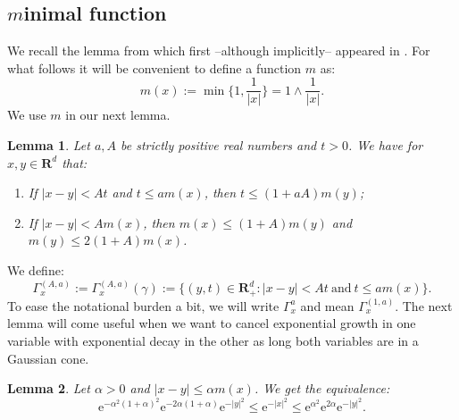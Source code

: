 \documentclass[a4paper,oneside,10pt]{amsproc}
\theoremstyle{plain}
\newtheorem{lemma}{Lemma}
\theoremstyle{remark}
\theoremstyle{definition}
\renewcommand{\leq}{\leqslant}
\renewcommand{\leq}{\leqslant}
\newcommand{\R}{\mathbf R}
\newcommand{\e}{\mathrm{e}} %
\renewcommand{\leq}{\leqslant}%
\begin{document}
\subsection{$m$inimal function}
We recall the lemma from \cite[lemma 2.3]{Maas2011b} which first
--although implicitly-- appeared in \cite{Mauceri2007}. For what
follows it will be convenient to define a function $m$ as:
\begin{equation*}
  m(x) := \min\biggl\{1, \frac1{|x|} \biggr\} = 1 \wedge \frac1{|x|}.
\end{equation*}
We use $m$ in our next lemma.
\begin{lemma}\label{lem:m-xy-equivalence}%
  Let $a, A$ be strictly positive real numbers and $t > 0$. We have
  for $x, y \in \R^d$ that:
  \begin{enumerate}
  \item If $|x - y| < A t$ and $t \leq a m(x)$, then $t
    \leq (1 + aA) m(y)$;
  \item If $|x - y| < A m(x)$, then $m(x) \leq (1 +
    A) m(y)$ and $m(y) \leq 2 (1 + A) m(x)$. 
  \end{enumerate}
\end{lemma}
We define:
\begin{equation}
  \label{eq:Gaussian-cone}
  \Gamma_x^{(A, a)} := \Gamma_x^{(A, a)}(\gamma) := \{(y, t) \in
  \R^d_+ : |x - y| < At \:\text{and}\: t \leq a m(x)\}.
\end{equation}
To ease the notational burden a bit, we will write $\Gamma_x^a$ and
mean $\Gamma_x^{(1, a)}$. 
The next lemma will come useful when we want to cancel exponential
growth in one variable with exponential decay in the other as long
both variables are in a Gaussian cone.
\begin{lemma}\label{lem:Cone-Gaussians-comparable}
  Let $\alpha > 0$ and $|x - y| \leq \alpha m(x)$. We get the
  equivalence:
  \begin{equation*}
    \e^{-\alpha^2(1 + \alpha)^2} \e^{-2\alpha(1 + \alpha)} \e^{-|y|^2}
    \leq \e^{-|x|^2} \leq \e^{\alpha^2} \e^{2\alpha} \e^{-|y|^2}.
  \end{equation*}
\end{lemma}
\end{document}
